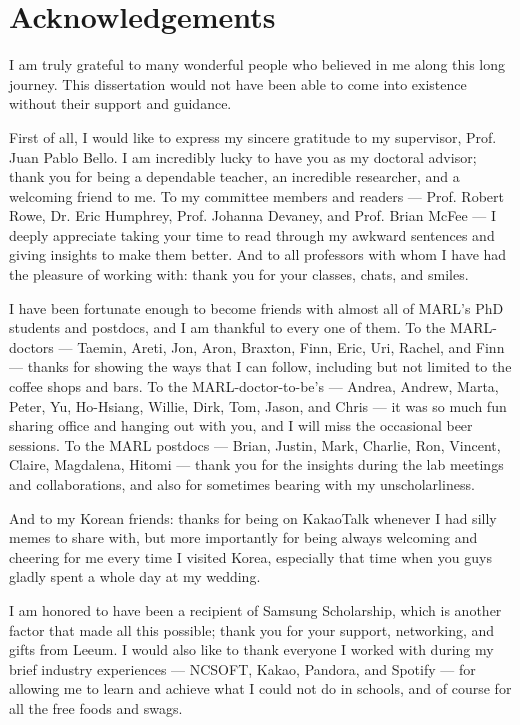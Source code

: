

\chapter*{Acknowledgements}

I am truly grateful to many wonderful people who believed in me along this long journey. This dissertation would not have been able to come into existence without their support and guidance.

First of all, I would like to express my sincere gratitude to my supervisor, Prof. Juan Pablo Bello.
I am incredibly lucky to have you as my doctoral advisor; thank you for being a dependable teacher, an incredible researcher, and a welcoming friend to me.
To my committee members and readers --- Prof. Robert Rowe, Dr. Eric Humphrey, Prof. Johanna Devaney, and Prof. Brian McFee --- I deeply appreciate taking your time to read through my awkward sentences and giving insights to make them better.
And to all professors with whom I have had the pleasure of working with: thank you for your classes, chats, and smiles.

I have been fortunate enough to become friends with almost all of MARL's PhD students and postdocs, and I am thankful to every one of them.
To the MARL-doctors --- Taemin, Areti, Jon, Aron, Braxton, Finn, Eric, Uri, Rachel, and Finn --- thanks for showing the ways that I can follow, including but not limited to the coffee shops and bars.
To the MARL-doctor-to-be's --- Andrea, Andrew, Marta, Peter, Yu, Ho-Hsiang, Willie, Dirk, Tom, Jason, and Chris --- it was so much fun sharing office and hanging out with you, and I will miss the occasional beer sessions.
To the MARL postdocs --- Brian, Justin, Mark, Charlie, Ron, Vincent, Claire, Magdalena, Hitomi --- thank you for the insights during the lab meetings and collaborations, and also for sometimes bearing with my unscholarliness.

And to my Korean friends: thanks for being on KakaoTalk whenever I had silly memes to share with, but more importantly for being always welcoming and cheering for me every time I visited Korea, especially that time when you guys gladly spent a whole day at my wedding.

I am honored to have been a recipient of Samsung Scholarship, which is another factor that made all this possible; thank you for your support, networking, and gifts from Leeum.
I would also like to thank everyone I worked with during my brief industry experiences --- NCSOFT, Kakao, Pandora, and Spotify --- for allowing me to learn and achieve what I could not do in schools, and of course for all the free foods and swags.

